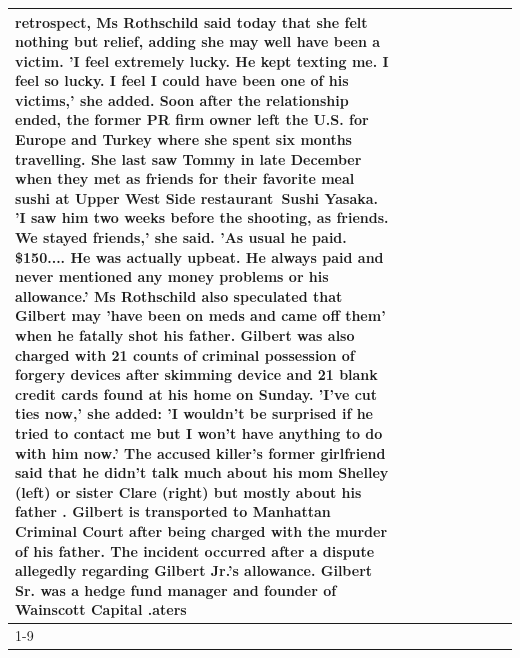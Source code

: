 \begin{table}[H]
\begin{tabular}{lllrlllll}
retrospect, Ms Rothschild said today that she felt nothing but relief, adding she may well have been a victim. 'I feel extremely lucky. He kept texting me. I feel so lucky. I feel I could have been one of his victims,' she added. Soon after the relationship ended, the former PR firm owner left the U.S. for Europe and Turkey where she spent six months  travelling. She last saw Tommy in late December when they met as friends for their favorite meal sushi at Upper West Side restaurant Sushi Yasaka. 'I saw him two weeks before the shooting, as friends. We stayed friends,' she said. 'As usual he paid. \$150.... He was actually upbeat. He always paid and never mentioned any money problems or his allowance.' Ms Rothschild also speculated that Gilbert may 'have been on meds and came off them' when he fatally shot his father. Gilbert was also charged with 21 counts of criminal possession of forgery devices after skimming device and 21 blank credit cards found at his home on Sunday. 'I've cut ties now,' she added: 'I wouldn’t be surprised if he tried to contact me but I won’t have anything to do with him now.' The accused killer's former girlfriend said that he didn't talk much about his mom Shelley (left) or sister Clare (right) but mostly about his father . Gilbert is transported to Manhattan Criminal Court  after being charged with the murder of his father. The incident occurred after a dispute allegedly regarding Gilbert Jr.'s allowance. Gilbert Sr. was a hedge fund manager and founder of Wainscott Capital .aters \\
\cline{1-9} \cline{2-9}

\end{tabular}
\end{table}
